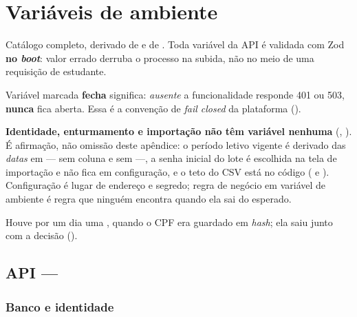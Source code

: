 \chapter{Variáveis de ambiente}
\label{ap:envs}

Catálogo completo, derivado de  e de
. Toda variável da API é validada com Zod
\textbf{no \emph{boot}}: valor errado derruba o processo na subida, não no meio de
uma requisição de estudante.

\begin{regra}
Variável marcada \textbf{fecha} significa: \emph{ausente} \implica{} a
funcionalidade responde 401 ou 503, \textbf{nunca} fica aberta. Essa é a
convenção de \emph{fail closed} da plataforma ().
\end{regra}

\begin{decisao}
\textbf{Identidade, enturmamento e importação não têm variável nenhuma}
(, ). É afirmação, não omissão deste apêndice: o
período letivo vigente é derivado das \emph{datas} em  ---
sem coluna  e sem  ---, a senha inicial do lote é
escolhida na tela de importação e não fica em configuração, e o teto do CSV está
no código ( e ). Configuração é lugar de
endereço e segredo; regra de negócio em variável de ambiente é regra que ninguém
encontra quando ela sai do esperado.

Houve por um dia uma , quando o CPF era guardado em \emph{hash};
ela saiu junto com a decisão ().
\end{decisao}

\section{API --- }

\subsection{Banco e identidade}

